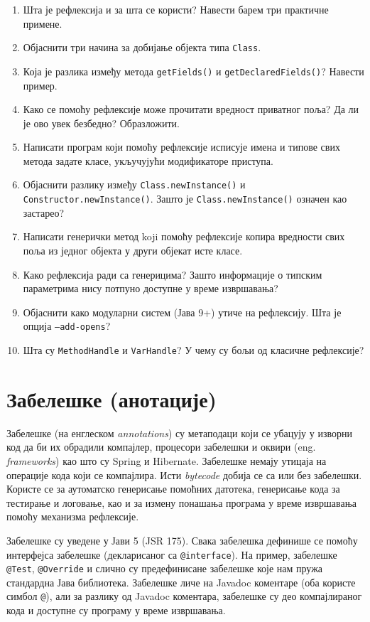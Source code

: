 \begin{enumerate}
\item Шта је рефлексија и за шта се користи? Навести барем три практичне примене.
\item Објаснити три начина за добијање објекта типа \texttt{Class}.
\item Која је разлика између метода \texttt{getFields()} и \texttt{getDeclaredFields()}? Навести пример.
\item Како се помоћу рефлексије може прочитати вредност приватног поља? Да ли је ово увек безбедно? Образложити.
\item Написати програм који помоћу рефлексије исписује имена и типове свих метода задате класе, укључујући модификаторе приступа.
\item Објаснити разлику између \texttt{Class.newInstance()} и \texttt{Constructor.newInstance()}. Зашто је \texttt{Class.newInstance()} означен као застарео?
\item Написати генерички метод koji помоћу рефлексије копира вредности свих поља из једног објекта у други објекат исте класе.
\item Како рефлексија ради са генерицима? Зашто информације о типским параметрима нису потпуно доступне у време извршавања?
\item Објаснити како модуларни систем (Јава 9+) утиче на рефлексију. Шта је опција \texttt{--add-opens}?
\item Шта су \texttt{MethodHandle} и \texttt{VarHandle}? У чему су бољи од класичне рефлексије?
\end{enumerate}


\setlength{\parindent}{15pt}
\setlength{\parskip}{0pt}
\chapter{Забелешке (анотације)}

Забелешке (на енглеском \textit{annotations}) су метаподаци који се убацују у изворни код да би их обрадили компајлер, процесори забелешки и оквири (eng. \textit{frameworks}) као што су Spring и Hibernate. Забелешке немају утицаја на операције кода који се компајлира. Исти \textit{bytecode} добија се са или без забелешки. Користе се за аутоматско генерисање помоћних датотека, генерисање кода за тестирање и логовање, као и за измену понашања програма у време извршавања помоћу механизма рефлексије.

Забелешке су уведене у Јави 5 (JSR 175). Свака забелешка дефинише се помоћу интерфејса забелешке (декларисаног са \texttt{@interface}). На пример, забелешке \texttt{@Test}, \texttt{@Override} и слично су предефинисане забелешке које нам пружа стандардна Јава библиотека. Забелешке личе на Javadoc коментаре (оба користе симбол \texttt{@}), али за разлику од Javadoc коментара, забелешке су део компајлираног кода и доступне су програму у време извршавања.

